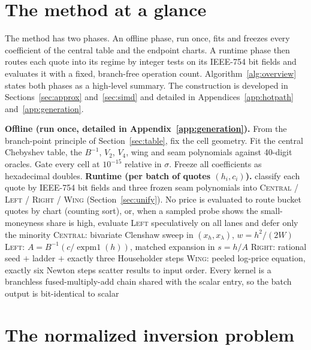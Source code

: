 \documentclass[11pt]{article}
\newcommand{\expmone}{\operatorname{expm1}}
\begin{document}
\section{The method at a glance}
\label{sec:overview}

The method has two phases. An offline phase, run once, fits and freezes every coefficient of the central table and the endpoint charts. A runtime phase then routes each quote into its regime by integer tests on its IEEE-754 bit fields and evaluates it with a fixed, branch-free operation count. Algorithm~\ref{alg:overview} states both phases as a high-level summary. The construction is developed in Sections~\ref{sec:approx} and~\ref{sec:simd} and detailed in Appendices~\ref{app:hotpath} and~\ref{app:generation}.

\begin{algorithm}[H]
	\caption{The routed inverter at a glance}
	\label{alg:overview}
	\begin{algorithmic}[1]
\Statex \textbf{Offline (run once, detailed in Appendix~\ref{app:generation}).} From the branch-point principle of Section~\ref{sec:table}, fix the cell geometry. Fit the central Chebyshev table, the $B^{-1}$, $V_2$, $V_4$, wing and seam polynomials against 40-digit oracles. Gate every cell at $10^{-15}$ relative in $\sigma$. Freeze all coefficients as hexadecimal doubles.
\Statex \textbf{Runtime (per batch of quotes $(h_i, c_i)$).}
\State classify each quote by IEEE-754 bit fields and three frozen seam polynomials into \textsc{Central} / \textsc{Left} / \textsc{Right} / \textsc{Wing} (Section~\ref{sec:unify}). No price is evaluated to route
\State bucket quotes by chart (counting sort), or, when a sampled probe shows the small-moneyness share is high, evaluate \textsc{Left} speculatively on all lanes and defer only the minority
\State \textsc{Central}: bivariate Clenshaw sweep in $(x_h, x_\lambda)$, $w = h^2/(2W)$
\State \textsc{Left}: $A=B^{-1}(c/\expmone(h))$, matched expansion in $s=h/A$
\State \textsc{Right}: rational seed $+$ ladder $+$ exactly three Householder steps
\State \textsc{Wing}: peeled log-price equation, exactly six Newton steps
\EndFor
\State scatter results to input order. Every kernel is a branchless fused-multiply-add chain shared with the scalar entry, so the batch output is bit-identical to scalar
	\end{algorithmic}
\end{algorithm}

\section{The normalized inversion problem}
\label{sec:setup}
\end{document}
